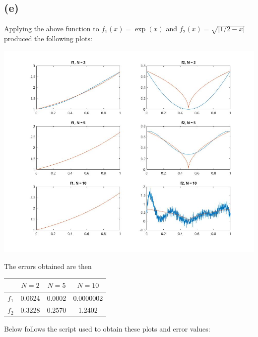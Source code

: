 \documentclass{article}
\begin{document}
\subsection*{(e)}

Applying the above function to $f_1(x) = \exp(x)$ and
$f_2(x) = \sqrt{|1/2 - x|}$ produced the following
plots:

\begin{center}
	\includegraphics[width=\textwidth]{figure.jpg}
\end{center}

The errors obtained are then
\begin{center}
\begin{tabular}{ | c | c c c |}
\hline
 & $N = 2$ & $N=5$ & $N=10$ \\
 \hline
$f_1$ & 0.0624 & 0.0002 & 0.0000002 \\
$f_2$ & 0.3228 & 0.2570 & 1.2402\\
\hline
\end{tabular}
\end{center}
Below follows the script used to obtain these plots and
error values:
\end{document}
